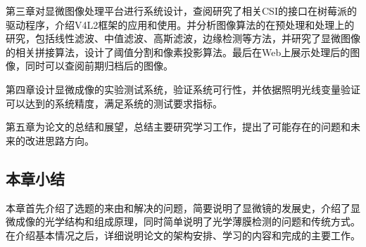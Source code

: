 第三章对显微图像处理平台进行系统设计，查阅研究了相关CSI的接口在树莓派的驱动程序，介绍V4L2框架的应用和使用。并分析图像算法的在预处理和处理上的研究，包括线性滤波、中值滤波、高斯滤波，边缘检测等方法，并研究了显微图像的相关拼接算法，设计了阈值分割和像素投影算法。最后在Web上展示处理后的图像，同时可以查阅前期归档后的图像。

第四章设计显微成像的实验测试系统，验证系统可行性，并依据照明光线变量验证可以达到的系统精度，满足系统的测试要求指标。

第五章为论文的总结和展望，总结主要研究学习工作，提出了可能存在的问题和未来的改进思路方向。


\subsection{本章小结}
本章首先介绍了选题的来由和解决的问题，简要说明了显微镜的发展史，介绍了显微成像的光学结构和组成原理，同时简单说明了光学薄膜检测的问题和传统方式。在介绍基本情况之后，详细说明论文的架构安排、学习的内容和完成的主要工作。
